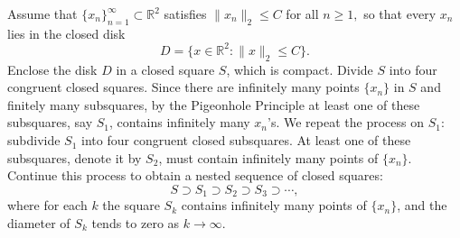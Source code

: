 \documentclass{article}
\begin{document}
Assume that \(\{x_n\}_{n=1}^\infty \subset \mathbb{R}^2\) satisfies \(\|x_n\|_2 \leq C \) for all \( n \geq 1,\) so that every \(x_n\) lies in the closed disk
\[
D = \{x \in \mathbb{R}^2 : \|x\|_2 \leq C\}.
\]
Enclose the disk \(D\) in a closed square \(S\), which is compact. Divide \(S\) into four congruent closed squares. Since there are infinitely many points \(\{x_n\}\) in \(S\) and finitely many subsquares, by the Pigeonhole Principle at least one of these subsquares, say \(S_1\), contains infinitely many \(x_n\)'s. We repeat the process on \(S_1\): subdivide \(S_1\) into four congruent closed subsquares. At least one of these subsquares, denote it by \(S_2\), must contain infinitely many points of \(\{x_n\}\). Continue this process to obtain a nested sequence of closed squares:
\[
S \supset S_1 \supset S_2 \supset S_3 \supset \cdots,
\]
where for each \(k\) the square \(S_k\) contains infinitely many points of \(\{x_n\}\), and the diameter of \(S_k\) tends to zero as \(k \to \infty\). 
\end{document}
